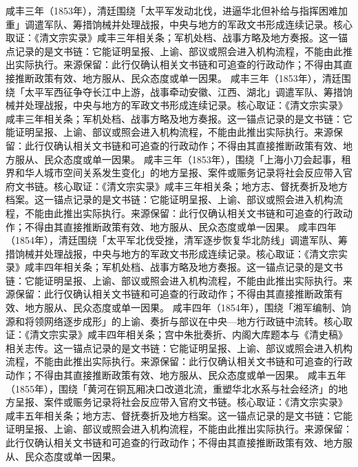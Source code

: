 咸丰三年（1853年），清廷围绕「太平军发动北伐，进逼华北但补给与指挥困难加重」调遣军队、筹措饷械并处理战报，中央与地方的军政文书形成连续记录。核心取证：《清文宗实录》咸丰三年相关条；军机处档、战事方略及地方奏报。这一锚点记录的是文书链：它能证明呈报、上谕、部议或照会进入机构流程，不能由此推出实际执行。来源保留：此行仅确认相关文书链和可追查的行政动作；不得由其直接推断政策有效、地方服从、民众态度或单一因果。
咸丰三年（1853年），清廷围绕「太平军西征争夺长江中上游，战事牵动安徽、江西、湖北」调遣军队、筹措饷械并处理战报，中央与地方的军政文书形成连续记录。核心取证：《清文宗实录》咸丰三年相关条；军机处档、战事方略及地方奏报。这一锚点记录的是文书链：它能证明呈报、上谕、部议或照会进入机构流程，不能由此推出实际执行。来源保留：此行仅确认相关文书链和可追查的行政动作；不得由其直接推断政策有效、地方服从、民众态度或单一因果。
咸丰三年（1853年），围绕「上海小刀会起事，租界和华人城市空间关系发生变化」的地方呈报、案件或赈务记录将社会反应带入官府文书链。核心取证：《清文宗实录》咸丰三年相关条；地方志、督抚奏折及地方档案。这一锚点记录的是文书链：它能证明呈报、上谕、部议或照会进入机构流程，不能由此推出实际执行。来源保留：此行仅确认相关文书链和可追查的行政动作；不得由其直接推断政策有效、地方服从、民众态度或单一因果。
咸丰四年（1854年），清廷围绕「太平军北伐受挫，清军逐步恢复华北防线」调遣军队、筹措饷械并处理战报，中央与地方的军政文书形成连续记录。核心取证：《清文宗实录》咸丰四年相关条；军机处档、战事方略及地方奏报。这一锚点记录的是文书链：它能证明呈报、上谕、部议或照会进入机构流程，不能由此推出实际执行。来源保留：此行仅确认相关文书链和可追查的行政动作；不得由其直接推断政策有效、地方服从、民众态度或单一因果。
咸丰四年（1854年），围绕「湘军编制、饷源和将领网络逐步成形」的上谕、奏折与部议在中央—地方行政链中流转。核心取证：《清文宗实录》咸丰四年相关条；宫中朱批奏折、内阁大库题本与《清史稿》相关志传。这一锚点记录的是文书链：它能证明呈报、上谕、部议或照会进入机构流程，不能由此推出实际执行。来源保留：此行仅确认相关文书链和可追查的行政动作；不得由其直接推断政策有效、地方服从、民众态度或单一因果。
咸丰五年（1855年），围绕「黄河在铜瓦厢决口改道北流，重塑华北水系与社会经济」的地方呈报、案件或赈务记录将社会反应带入官府文书链。核心取证：《清文宗实录》咸丰五年相关条；地方志、督抚奏折及地方档案。这一锚点记录的是文书链：它能证明呈报、上谕、部议或照会进入机构流程，不能由此推出实际执行。来源保留：此行仅确认相关文书链和可追查的行政动作；不得由其直接推断政策有效、地方服从、民众态度或单一因果。
